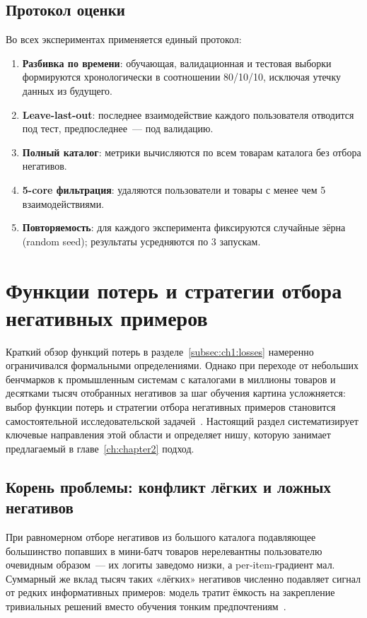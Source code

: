 \subsection{Протокол оценки}
\label{subsec:ch1:eval_protocol}

Во всех экспериментах применяется единый протокол:

\begin{enumerate}
    \item \textbf{Разбивка по времени}: обучающая, валидационная и тестовая выборки формируются хронологически в соотношении 80/10/10, исключая утечку данных из будущего.
    \item \textbf{Leave-last-out}: последнее взаимодействие каждого пользователя отводится под тест, предпоследнее~--- под валидацию.
    \item \textbf{Полный каталог}: метрики вычисляются по всем товарам каталога без отбора негативов.
    \item \textbf{5-core фильтрация}: удаляются пользователи и товары с менее чем 5 взаимодействиями.
    \item \textbf{Повторяемость}: для каждого эксперимента фиксируются случайные зёрна (random seed); результаты усредняются по 3 запускам.
\end{enumerate}

\section{Функции потерь и стратегии отбора негативных примеров}
\label{sec:ch1:negatives}

Краткий обзор функций потерь в разделе~\ref{subsec:ch1:losses} намеренно ограничивался формальными
определениями. Однако при переходе от небольших бенчмарков к промышленным системам с каталогами в
миллионы товаров и десятками тысяч отобранных негативов за шаг обучения картина усложняется: выбор
функции потерь и стратегии отбора негативных примеров становится самостоятельной исследовательской
задачей~\cite{prakash2024neg}. Настоящий раздел систематизирует ключевые направления этой области и
определяет нишу, которую занимает предлагаемый в главе~\ref{ch:chapter2} подход.

\subsection{Корень проблемы: конфликт лёгких и ложных негативов}
\label{subsec:ch1:neg_problem}

При равномерном отборе негативов из большого каталога подавляющее большинство попавших в мини-батч
товаров нерелевантны пользователю очевидным образом~--- их логиты заведомо низки, а
per-item-градиент мал. Суммарный же вклад тысяч таких «лёгких» негативов численно подавляет сигнал
от редких информативных примеров: модель тратит ёмкость на закрепление тривиальных решений вместо
обучения тонким предпочтениям~\cite{ding2020srns}.

